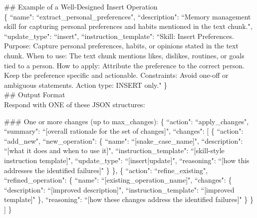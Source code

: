 \begin{center}
\begin{tcolorbox}[title={Designer Refinement Prompt (1/2)}]
{\#\# Example of a Well-Designed Insert Operation \\
\{
    ``name": ``extract\_personal\_preferences",
    ``description": ``Memory management skill for capturing personal preferences and habits mentioned in the text chunk.",
    ``update\_type": ``insert",
    ``instruction\_template": ``Skill: Insert Preferences. Purpose: Capture personal preferences, habits, or opinions stated in the text chunk. When to use: The text chunk mentions likes, dislikes, routines, or goals tied to a person. How to apply: Attribute the preference to the correct person. Keep the preference specific and actionable. Constraints: Avoid one-off or ambiguous statements. Action type: INSERT only."
\} \\


\#\# Output Format \\
Respond with ONE of these JSON structures:

\#\#\# One or more changes (up to {max\_changes}):
\{
    ``action": ``apply\_changes",
    ``summary": ``[overall rationale for the set of changes]",
    ``changes": [
        \{
            ``action": ``add\_new",
            ``new\_operation": \{
                ``name": ``[snake\_case\_name]",
                ``description": ``[what it does and when to use it]",
                ``instruction\_template": ``[skill-style instruction template]",
                ``update\_type": ``[insert|update]",
                ``reasoning": ``[how this addresses the identified failures]"
            \}
        \},
        \{
            ``action": ``refine\_existing",
            ``refined\_operation": \{
                ``name": ``[existing\_operation\_name]",
                ``changes": \{
                    ``description": ``[improved description]",
                    ``instruction\_template": ``[improved template]"
                \},
                ``reasoning": ``[how these changes address the identified failures]"
            \}
        \}
    ]
\}


}
\label{appendix:case_designer_2_1}
\end{tcolorbox}
\end{center}



